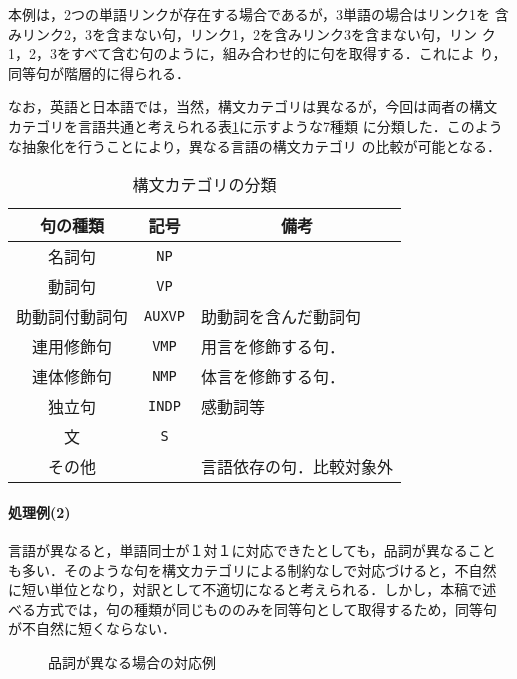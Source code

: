 本例は，2つの単語リンクが存在する場合であるが，3単語の場合はリンク1を
含みリンク2，3を含まない句，リンク1，2を含みリンク3を含まない句，リン
ク1，2，3をすべて含む句のように，組み合わせ的に句を取得する．これによ
り，同等句が階層的に得られる．

なお，英語と日本語では，当然，構文カテゴリは異なるが，今回は両者の構文
カテゴリを言語共通と考えられる表\ref{tab-phrase-type}に示すような7種類
に分類した．このような抽象化を行うことにより，異なる言語の構文カテゴリ
の比較が可能となる．

\begin{table}
\begin{center}
\caption{構文カテゴリの分類}\label{tab-phrase-type}
{\smalltable
\begin{tabular}{ccl}
\hline\hline
句の種類 & 記号 & \multicolumn{1}{c}{備考} \\
\hline
名詞句		& {\tt NP}	& \\
動詞句		& {\tt VP}	& \\
助動詞付動詞句	& {\tt AUXVP}	& 助動詞を含んだ動詞句 \\
連用修飾句	& {\tt VMP}	& 用言を修飾する句． \\
連体修飾句	& {\tt NMP}	& 体言を修飾する句． \\
独立句		& {\tt INDP}	& 感動詞等\\
文		& {\tt S}	& \\
\hline
その他		& 	& 言語依存の句．比較対象外 \\
\hline\hline
\end{tabular}
}
\end{center}
\end{table}

\paragraph{処理例(2)}

言語が異なると，単語同士が１対１に対応できたとしても，品詞が異なること
も多い．そのような句を構文カテゴリによる制約なしで対応づけると，不自然
に短い単位となり，対訳として不適切になると考えられる．しかし，本稿で述
べる方式では，句の種類が同じもののみを同等句として取得するため，同等句
が不自然に短くならない．

\begin{figure}
\begin{center}
\caption{品詞が異なる場合の対応例}\label{fig-example2}
\end{center}
\end{figure}

